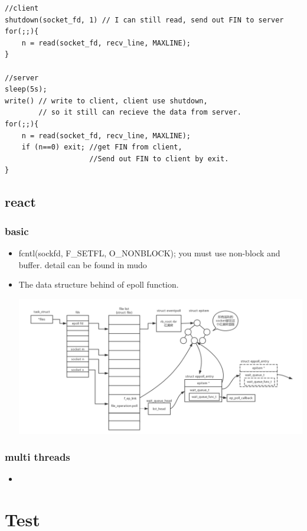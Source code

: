 \documentclass[a4paper,11pt,twoside]{book}
\begin{document}
\begin{itemize}
\begin{lstlisting}
//client
shutdown(socket_fd, 1) // I can still read, send out FIN to server
for(;;){
	n = read(socket_fd, recv_line, MAXLINE);
}

//server
sleep(5s);
write() // write to client, client use shutdown, 
        // so it still can recieve the data from server. 
for(;;){
	n = read(socket_fd, recv_line, MAXLINE);
	if (n==0) exit; //get FIN from client, 
	                //Send out FIN to client by exit.
}
\end{lstlisting}
	
\end{itemize}

\section{react}
\subsection{basic}
\begin{itemize}
	\item fcntl(sockfd, F\_SETFL, O\_NONBLOCK); you must use non-block and buffer. detail can be found in mudo
	\item The data structure behind of epoll function. 
\begin{center}
	\includegraphics[width=0.85\linewidth]{pics/epoll.png}
\end{center}
\end{itemize}
\subsection{multi threads}
\begin{itemize}
	\item 
\end{itemize}


\chapter{Test}
\end{document}
